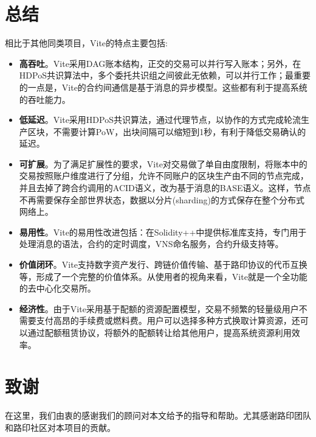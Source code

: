 \documentclass[UTF8,nofonts]{ctexart}
\begin{document}
\begin{multicols}{2}
\section{总结}
相比于其他同类项目，Vite的特点主要包括:

\begin{itemize}
	\item \textbf{高吞吐}。Vite采用DAG账本结构，正交的交易可以并行写入账本；另外，在HDPoS共识算法中，多个委托共识组之间彼此无依赖，可以并行工作；最重要的一点是，Vite的合约间通信是基于消息的异步模型。这些都有利于提高系统的吞吐能力。
	\item \textbf{低延迟}。Vite采用HDPoS共识算法，通过代理节点，以协作的方式完成轮流生产区块，不需要计算PoW，出块间隔可以缩短到1秒，有利于降低交易确认的延迟。
	\item \textbf{可扩展}。为了满足扩展性的要求，Vite对交易做了单自由度限制，将账本中的交易按照账户维度进行了分组，允许不同账户的区块生产由不同的节点完成，并且去掉了跨合约调用的ACID语义，改为基于消息的BASE语义。这样，节点不再需要保存全部世界状态，数据以分片(sharding)的方式保存在整个分布式网络上。
	\item \textbf{易用性}。Vite的易用性改进包括：在Solidity++中提供标准库支持，专门用于处理消息的语法，合约的定时调度，VNS命名服务，合约升级支持等。
	\item \textbf{价值闭环}。Vite支持数字资产发行、跨链价值传输、基于路印协议的代币互换等，形成了一个完整的价值体系。从使用者的视角来看，Vite就是一个全功能的去中心化交易所。
	\item \textbf{经济性}。由于Vite采用基于配额的资源配置模型，交易不频繁的轻量级用户不需要支付高昂的手续费或燃料费。用户可以选择多种方式换取计算资源，还可以通过配额租赁协议，将额外的配额转让给其他用户，提高系统资源利用效率。
\end{itemize}
\section{致谢}
在这里，我们由衷的感谢我们的顾问对本文给予的指导和帮助。尤其感谢路印团队和路印社区对本项目的贡献。

\end{multicols}



\end{document}

